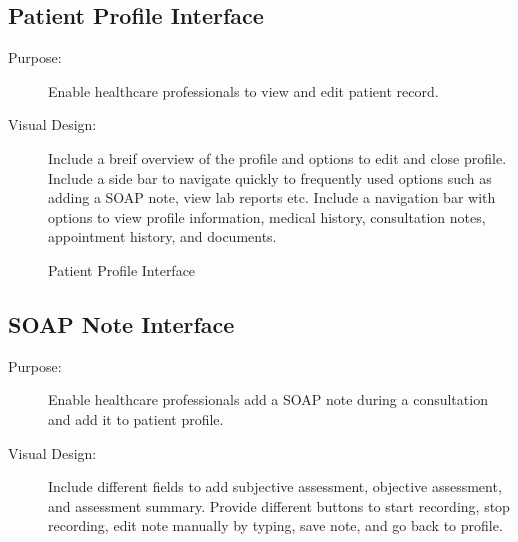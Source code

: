 \documentclass[12pt, titlepage]{article}
\begin{document}
\newpage{}


\subsection{Patient Profile Interface}
\begin{description}
    \item[Purpose:]Enable healthcare professionals to view and edit patient record.

    \item[Visual Design:]Include a breif overview of the profile and options to edit and close profile. Include a side bar to navigate quickly to frequently used options such as adding a SOAP note, view lab reports etc. Include a navigation bar with options to view profile information, medical history, consultation notes, appointment history, and documents.
    
\end{description}

\begin{figure}[h!]
    \centering
    \caption{Patient Profile Interface}
    \label{fig:healthcare-interface-2}
\end{figure}

\newpage{}

\subsection{SOAP Note Interface}
\begin{description}
    \item[Purpose:]Enable healthcare professionals add a SOAP note during a consultation and add it to patient profile.

    \item[Visual Design:]Include different fields to add subjective assessment, objective assessment, and assessment summary. Provide different buttons to start recording, stop recording, edit note manually by typing, save note, and go back to profile.
    
\end{description}
\end{document}
